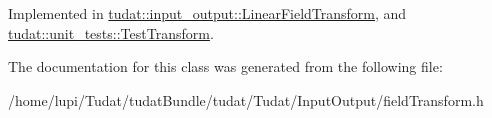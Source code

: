 Implemented in \hyperlink{classtudat_1_1input__output_1_1LinearFieldTransform_ac4bb87a66f329fc36999f8fd78d477e4}{tudat\+::input\+\_\+output\+::\+Linear\+Field\+Transform}, and \hyperlink{structtudat_1_1unit__tests_1_1TestTransform_aa68c181987c9d82d51bcfae675c6fdba}{tudat\+::unit\+\_\+tests\+::\+Test\+Transform}.



The documentation for this class was generated from the following file\+:\begin{DoxyCompactItemize}
\item 
/home/lupi/\+Tudat/tudat\+Bundle/tudat/\+Tudat/\+Input\+Output/field\+Transform.\+h\end{DoxyCompactItemize}

